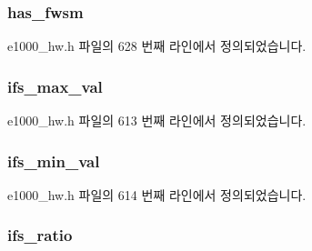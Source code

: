 \subsubsection[{\texorpdfstring{has\+\_\+fwsm}{has_fwsm}}]{ has\+\_\+fwsm}\hypertarget{structe1000__mac__info_a7e6a1e5d6d88bd8bd3ad0b38791562ac}{}\label{structe1000__mac__info_a7e6a1e5d6d88bd8bd3ad0b38791562ac}


e1000\+\_\+hw.\+h 파일의 628 번째 라인에서 정의되었습니다.

\subsubsection[{\texorpdfstring{ifs\+\_\+max\+\_\+val}{ifs_max_val}}]{ ifs\+\_\+max\+\_\+val}\hypertarget{structe1000__mac__info_af9ea114a3414be80f2975880c2105041}{}\label{structe1000__mac__info_af9ea114a3414be80f2975880c2105041}


e1000\+\_\+hw.\+h 파일의 613 번째 라인에서 정의되었습니다.

\subsubsection[{\texorpdfstring{ifs\+\_\+min\+\_\+val}{ifs_min_val}}]{ ifs\+\_\+min\+\_\+val}\hypertarget{structe1000__mac__info_a3dc9589a31f7c674c750dbbb69976959}{}\label{structe1000__mac__info_a3dc9589a31f7c674c750dbbb69976959}


e1000\+\_\+hw.\+h 파일의 614 번째 라인에서 정의되었습니다.

\subsubsection[{\texorpdfstring{ifs\+\_\+ratio}{ifs_ratio}}]{ ifs\+\_\+ratio}\hypertarget{structe1000__mac__info_a6d761828f44e7976f79eca232606eff1}{}\label{structe1000__mac__info_a6d761828f44e7976f79eca232606eff1}



